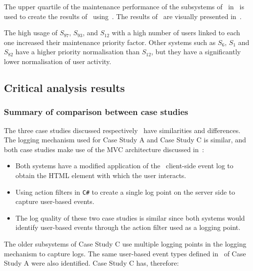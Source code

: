 

The upper quartile of the maintenance performance of the subsystems of~ in~ is used to create the results of~ using~. The results of~ are visually presented in~.\par The high usage of $S_{97}$, $S_{93}$, and $S_{12}$ with a high number of users linked to each one increased their maintenance priority factor. Other systems such as $S_{6}$, $S_{1}$ and $S_{82}$ have a higher priority normalisation than $S_{12}$, but they have a significantly lower normalisation of user activity.

\subsection{Critical analysis results}\label{sec:ch3_criticalAnalysis}

\subsubsection{Summary of comparison between case studies}
The three case studies discussed respectively~ have similarities and differences. The logging mechanism used for Case Study A and Case Study C is similar, and both case studies make use of the MVC architecture discussed in~:

\begin{itemize}
	\item Both systems have a modified application of the~ client-side event log to obtain the HTML element with which the user interacts.
	\item Using action filters in \texttt{C\#} to create a single log point on the server side to capture user-based events. 
	\item The log quality of these two case studies is similar since both systems would identify user-based events through the action filter used as a logging point.
\end{itemize}

The older subsystems of Case Study C use multiple logging points in the logging mechanism to capture logs. The same user-based event types defined in~ of Case Study A were also identified. Case Study C has, therefore:

